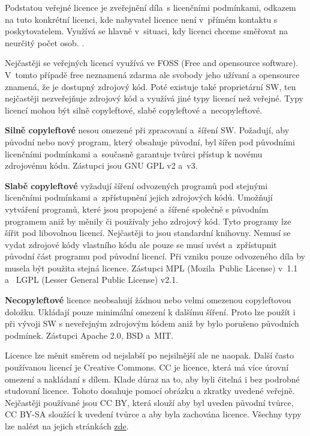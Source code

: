 Podstatou veřejné licence je zveřejnění díla~s licenčními podmínkami, odkazem na tuto konkrétní licenci, kde nabyvatel licence není v~přímém kontaktu s poskytovatelem. Využívá se hlavně v~situaci, kdy licenci chceme směřovat na neurčitý počet osob. .
\vspace{0.05cm}

Nejčastěji se veřejných licencí využívá ve FOSS (Free and opensource software). V~tomto případě free neznamená zdarma ale svobody jeho užívaní a opensource znamená, že je dostupný zdrojový kód. Poté existuje také proprietární SW, ten nejčastěji nezveřejňuje zdrojový kód a využívá jiné typy licencí než veřejné. Typy licencí mohou být silně copyleftové, slabě copyleftové a~necopyleftové.

\textbf{Silně copyleftové} nesou omezené při zpracovaní a~šíření SW. Požadují, aby původní nebo nový program, který obsahuje původní, byl šířen pod původními licenčními podmínkami a~současně garantuje tvůrci přístup k novému zdrojovému kódu. Zástupci jsou GNU GPL v2 a~v3.

\textbf{Slabě copyleftové} vyžadují šíření odvozených programů pod stejnými licenčními podmínkami a~zpřístupnění jejich zdrojových kódů. Umožňují vytváření programů, které jsou propojené a~šířené společně s původním programem aniž by měnily či používaly jeho zdrojový kód. Tyto programy lze šířit pod libovolnou licencí. Nejčastěji to jsou standardní knihovny. Nemusí se vydat zdrojové kódy vlastního kódu ale pouze se musí uvést a~zpřístupnit původní část programu pod původní licencí. Při vzniku pouze odvozeného díla by musela být použita stejná licence. Zástupci MPL (Mozila~Public License) v~1.1 a~ LGPL (Lesser General Public License) v2.1.

\textbf{Necopyleftové} licence neobsahují žádnou nebo velmi omezenou copyleftovou doložku. Ukládají pouze minimální omezení k dalšímu šíření. Proto lze použít i při vývoji SW s neveřejným zdrojovým kódem aniž by bylo porušeno původních podmínek. Zástupci Apache 2.0, BSD a~MIT\@.
\vspace{0.2cm}

Licence lze měnit směrem od nejslabší po nejsilnější ale ne naopak. Další často používanou licencí je Creative Commons. CC je licence, která má více úrovní omezení a nakládaní s dílem. Klade důraz na to, aby byli čitelná i bez podrobné studovaní licence. Tohoto dosahuje pomocí obrázku a zkratky uvedené veřejně. Nejčastěji používané jsou CC BY, která slouží aby byl uveden původní tvůrce, CC BY-SA sloužící k uvedení tvůrce a aby byla zachována licence. Všechny typy lze nalézt na jejich stránkách \href{https://creativecommons.org/licenses/}{zde}.
\vspace{0.2cm}

